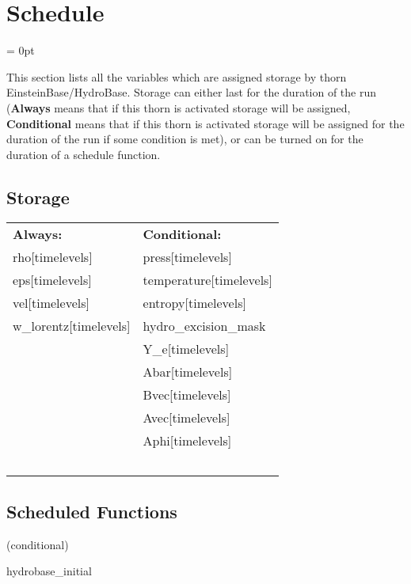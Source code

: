
\section{Schedule} 


\parskip = 0pt


\noindent This section lists all the variables which are assigned storage by thorn EinsteinBase/HydroBase.  Storage can either last for the duration of the run ({\bf Always} means that if this thorn is activated storage will be assigned, {\bf Conditional} means that if this thorn is activated storage will be assigned for the duration of the run if some condition is met), or can be turned on for the duration of a schedule function.


\subsection*{Storage}

\hspace{5mm}

 \begin{tabular*}{160mm}{ll} 

{\bf Always:}& {\bf Conditional:} \\ 
 rho[timelevels] &  press[timelevels]\\ 
 eps[timelevels] &  temperature[timelevels]\\ 
 vel[timelevels] &  entropy[timelevels]\\ 
 w\_lorentz[timelevels] &  hydro\_excision\_mask\\ 
~ &  Y\_e[timelevels]\\ 
~ &  Abar[timelevels]\\ 
~ &  Bvec[timelevels]\\ 
~ &  Avec[timelevels]\\ 
~ &  Aphi[timelevels]\\ 
~ & ~\\ 
\end{tabular*} 


\subsection*{Scheduled Functions}
\vspace{5mm}

   (conditional) 

\hspace{5mm} hydrobase\_initial 

\hspace{5mm}{\it hydrobase initial data group } 


